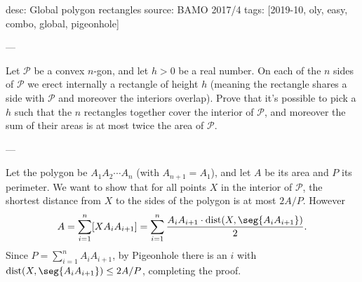 desc: Global polygon rectangles
source: BAMO 2017/4
tags: [2019-10, oly, easy, combo, global, pigeonhole]

---

Let $\mathcal P$ be a convex $n$-gon, and let $h>0$ be a real number. On each of the $n$ sides of $\mathcal P$ we erect internally a rectangle of height $h$ (meaning the rectangle shares a side with $\mathcal P$ and moreover the interiors overlap). Prove that it's possible to pick a $h$ such that the $n$ rectangles together cover the interior of $\mathcal P$, and moreover the sum of their areas is at most twice the area of $\mathcal P$.

---

Let the polygon be $A_1A_2\cdots A_n$ (with $A_{n+1}=A_1$), and let $A$ be its area and $P$ its perimeter. We want to show that for all points $X$ in the interior of $\mathcal P$, the shortest distance from $X$ to the sides of the polygon is at most $2A/P$. However \[A=\sum_{i=1}^n[XA_iA_{i+1}]=\sum_{i=1}^n\frac{A_iA_{i+1}\cdot\operatorname{dist}(X,\seg{A_iA_{i+1}})}2.\]
Since $P=\sum_{i=1}^nA_iA_{i+1}$, by Pigeonhole there is an $i$ with $\operatorname{dist}(X,\seg{A_iA_{i+1}})\le 2A/P$, completing the proof.
